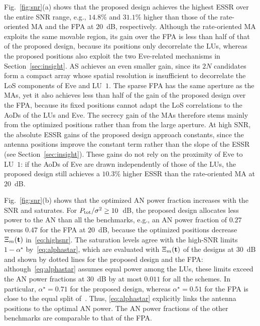 \documentclass[journal]{IEEEtran}
\newcommand{\rev}[1]{{\color{red}#1}}
\newcommand{\rev}[1]{#1}
\begin{document}
Fig.~\ref{fig:snr}(a) shows that the proposed design achieves the highest ESSR over the entire SNR range, e.g., \rev{$14.8\%$ and $31.1\%$} higher than those of the rate-oriented MA and the FPA at $20$~dB, respectively. Although the rate-oriented MA exploits the same movable region, its gain over the FPA is less than half of that of the proposed design, because its positions only decorrelate the LUs, whereas the proposed positions also exploit the two Eve-related mechanisms in Section~\ref{sec:insight}. AS achieves an even smaller gain, since its $2N$ candidates form a compact array whose spatial resolution is insufficient to decorrelate the LoS components of Eve and LU~$1$. The sparse FPA has the same aperture as the MAs, yet it also achieves less than half of the gain of the proposed design over the FPA, because its fixed positions cannot adapt the LoS correlations to the AoDs of the LUs and Eve. The secrecy gain of the MAs therefore stems mainly from the optimized positions rather than from the large aperture. At high SNR, the absolute ESSR gains of the proposed design approach constants, since the antenna positions improve the constant term rather than the slope of the ESSR (see Section~\ref{sec:insight}). \rev{These gains do not rely on the proximity of Eve to LU~$1$: if the AoDs of Eve are drawn independently of those of the LUs, the proposed design still achieves a $10.3\%$ higher ESSR than the rate-oriented MA at $20$~dB.}

Fig.~\ref{fig:snr}(b) shows that the optimized AN power fraction increases with the SNR and saturates. For $P_{\mathrm{tot}}/\sigma^2\ge10$~dB, the proposed design allocates less power to the AN than all the benchmarks, e.g., an AN power fraction of \rev{$0.27$ versus $0.47$} for the FPA at $20$~dB, because the optimized positions decrease $\Xi_m(\mathbf{t})$ in~\eqref{eq:highsnr}. \rev{The saturation levels agree with the high-SNR limits $1-\alpha^\star$ by~\eqref{eq:alphastar}, which are evaluated with $\Xi_m(\mathbf{t})$ of the designs at $30$~dB and shown by dotted lines for the proposed design and the FPA: although~\eqref{eq:alphastar} assumes equal power among the LUs, these limits exceed the AN power fractions at $30$~dB by at most $0.011$ for all the schemes. In particular, $\alpha^\star=0.71$ for the proposed design, whereas $\alpha^\star=0.51$ for the FPA is close to the equal split of~\cite{Zhou2010}. Thus, \eqref{eq:alphastar} explicitly links the antenna positions to the optimal AN power.} The AN power fractions of the other benchmarks are comparable to that of the FPA.
\end{document}
